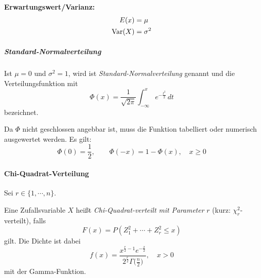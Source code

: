                     \textbf{Erwartungswert/Varianz:}
                    \begin{align*}
                    	E(x)    & = \mu      \\
                    	\operatorname{Var}(X) & = \sigma^2
                    \end{align*}
                    
                    \subparagraph{Standard-Normalverteilung}
                        \label{sec:snd}
                    
                        Ist \( \mu = 0 \) und \( \sigma^2 = 1 \), wird ist \textit{Standard-Normalverteilung} genannt und die Verteilungsfunktion mit
                        \begin{equation*}
	                        \Phi(x) = \frac{1}{\sqrt{2\pi}} \int_{-\infty}^{x} \! e^{-\frac{t^2}{2}} \, dt
                        \end{equation*}
                        bezeichnet.
                        
                        Da \( \Phi \) nicht geschlossen angebbar ist, muss die Funktion tabelliert oder numerisch ausgewertet werden. Es gilt:
                        \begin{equation*}
	                        \Phi(0) = \frac{1}{2}, \qquad \Phi(-x) = 1 - \Phi(x), \quad x \geq 0
                        \end{equation*}

                \paragraph{Chi-Quadrat-Verteilung}
                    Sei \( r \in \{ 1, \cdots, n \} \).
                    
                    Eine Zufallsvariable \(X\) heißt \textit{Chi-Quadrat-verteilt mit Parameter \(r\)} (kurz: \( \chi_r^2 \)-verteilt), falls
                    \begin{equation*}
                        F(x) = P(Z_1^2 + \cdots + Z_r^2 \leq x)
                    \end{equation*}
                    gilt. Die Dichte ist dabei
                    \begin{equation*}
                        f(x) = \frac{x^{\frac{r}{2} - 1} e^{-\frac{x}{2}}}{2^\frac{r}{2} \Gamma\big(\frac{n}{2}\big)}, \quad x > 0
                    \end{equation*}
                    mit der Gamma-Funktion.

